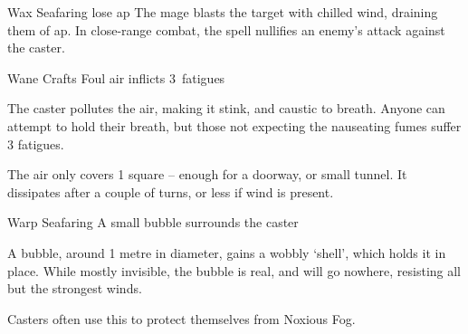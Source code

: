
  {\mAir}%
  {Wax}%
  {}%
  {Seafaring}%
  {lose  \gls{ap}}%
  {
    The mage blasts the target with chilled wind, draining them of  \gls{ap}.
    In close-range combat, the spell nullifies an enemy's attack against the caster.
  }


  {\mAir}%
  {Wane}%
  {}%
  {Crafts}%
  {Foul air inflicts 3~\glspl{fatigue}}%
  {
    The caster pollutes the air, making it stink, and caustic to breath.
    Anyone can attempt to hold their breath, but those not expecting the nauseating fumes suffer 3 \glspl{fatigue}.

    The air only covers 1 square -- enough for a doorway, or small tunnel.
    It dissipates after a couple of turns, or less if wind is present.
  }



  {\mAir}%
  {Warp}%
  {}%
  {Seafaring}%
  {A small bubble surrounds the caster}%
  {
    A bubble, around 1 metre in diameter, gains a wobbly `shell', which holds it in place.
    While mostly invisible, the bubble is real, and will go nowhere, resisting all but the strongest winds.

    Casters often use this to protect themselves from Noxious Fog.
  }



